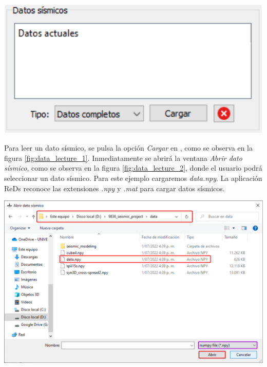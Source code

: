 \documentclass[12pt,twoside,letter]{ol-softwaremanual}
\newcommand*\circled[1]{\tikz[baseline=(char.base)]{
            \node[shape=circle,draw,inner sep=2pt] (char) {#1};}}
\newenvironment{Figure}
  {\par\medskip\noindent\minipage{\linewidth}}
  {\endminipage\par\medskip}
\begin{document}
\begin{multicols}{2}
	
\begin{Figure}
	\centering
	\includegraphics[width=.9\linewidth]{data-lecture-1.pdf}
	\label{fig:data_lecture_1}
\end{Figure}

Para leer un dato sísmico, se pulsa la opción \emph{Cargar} en \circled{2}, como se observa en la figura \ref{fig:data_lecture_1}. Inmediatamente se abrirá la ventana \textit{Abrir dato sísmico}, como se observa en la figura \ref{fig:data_lecture_2}, donde el usuario podrá seleccionar un dato sísmico. Para este ejemplo cargaremos \emph{data.npy}.
La aplicación ReDs reconoce las extensiones \emph{.npy} y \emph{.mat} para cargar datos sísmicos.

\end{multicols}

\begin{Figure}
    \centering
    \includegraphics[width=1\linewidth]{data-lecture-2.png}
    \label{fig:data_lecture_2}
\end{Figure}
\end{document}

